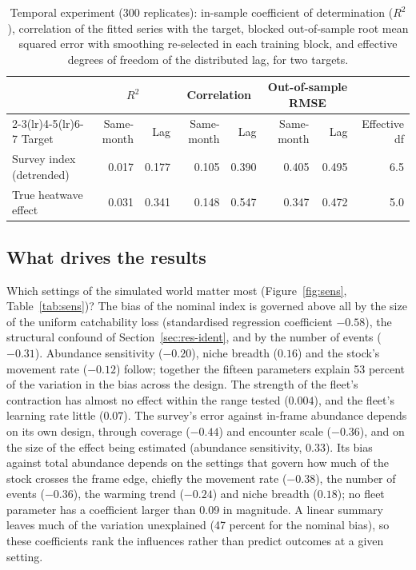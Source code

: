 \documentclass[11pt,a4paper]{article}
\begin{document}
\begin{table}[tbp]
\centering\footnotesize
\caption{Temporal experiment (300 replicates): in-sample coefficient of determination ($R^2$), correlation of the fitted series with the target, blocked out-of-sample root mean squared error with smoothing re-selected in each training block, and effective degrees of freedom of the distributed lag, for two targets.}
\label{tab:temporal}
\begin{tabular}{@{}lrrrrrrr@{}}
\toprule
 & \multicolumn{2}{c}{$R^2$} & \multicolumn{2}{c}{Correlation} & \multicolumn{2}{c}{Out-of-sample RMSE} & \\
\cmidrule(lr){2-3}\cmidrule(lr){4-5}\cmidrule(lr){6-7}
Target & Same-month & Lag & Same-month & Lag & Same-month & Lag & Effective df \\
\midrule
Survey index (detrended) & 0.017 & 0.177 & 0.105 & 0.390 & 0.405 & 0.495 & 6.5 \\
True heatwave effect & 0.031 & 0.341 & 0.148 & 0.547 & 0.347 & 0.472 & 5.0 \\
\bottomrule
\end{tabular}
\end{table}

\subsection{What drives the results}
\label{sec:res-sens}

Which settings of the simulated world matter most (Figure~\ref{fig:sens}, Table~\ref{tab:sens})? The bias of the nominal index is governed above all by the size of the uniform catchability loss (standardised regression coefficient $-0.58$), the structural confound of Section~\ref{sec:res-ident}, and by the number of events ($-0.31$). Abundance sensitivity ($-0.20$), niche breadth ($0.16$) and the stock's movement rate ($-0.12$) follow; together the fifteen parameters explain 53 percent of the variation in the bias across the design. The strength of the fleet's contraction has almost no effect within the range tested ($0.004$), and the fleet's learning rate little ($0.07$). The survey's error against in-frame abundance depends on its own design, through coverage ($-0.44$) and encounter scale ($-0.36$), and on the size of the effect being estimated (abundance sensitivity, $0.33$). Its bias against total abundance depends on the settings that govern how much of the stock crosses the frame edge, chiefly the movement rate ($-0.38$), the number of events ($-0.36$), the warming trend ($-0.24$) and niche breadth ($0.18$); no fleet parameter has a coefficient larger than 0.09 in magnitude. A linear summary leaves much of the variation unexplained (47 percent for the nominal bias), so these coefficients rank the influences rather than predict outcomes at a given setting.
\end{document}
